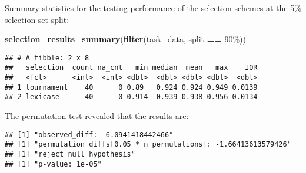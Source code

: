 \documentclass[
]{book}
\newenvironment{Shaded}{\begin{snugshade}}{\end{snugshade}}
\newcommand{\AttributeTok}[1]{\textcolor[rgb]{0.13,0.29,0.53}{#1}}
\newcommand{\DecValTok}[1]{\textcolor[rgb]{0.00,0.00,0.81}{#1}}
\newcommand{\FunctionTok}[1]{\textcolor[rgb]{0.13,0.29,0.53}{\textbf{#1}}}
\newcommand{\NormalTok}[1]{#1}
\newcommand{\OtherTok}[1]{\textcolor[rgb]{0.56,0.35,0.01}{#1}}
\newcommand{\SpecialCharTok}[1]{\textcolor[rgb]{0.81,0.36,0.00}{\textbf{#1}}}
\newcommand{\StringTok}[1]{\textcolor[rgb]{0.31,0.60,0.02}{#1}}
\begin{document}
Summary statistics for the testing performance of the selection schemes at the 5\% selection set split:

\begin{Shaded}
\begin{Highlighting}[]
\FunctionTok{selection\_results\_summary}\NormalTok{(}\FunctionTok{filter}\NormalTok{(task\_data, split }\SpecialCharTok{==} \StringTok{\textquotesingle{}90\%\textquotesingle{}}\NormalTok{))}
\end{Highlighting}
\end{Shaded}

\begin{verbatim}
## # A tibble: 2 x 8
##   selection  count na_cnt   min median  mean   max    IQR
##   <fct>      <int>  <int> <dbl>  <dbl> <dbl> <dbl>  <dbl>
## 1 tournament    40      0 0.89   0.924 0.924 0.949 0.0139
## 2 lexicase      40      0 0.914  0.939 0.938 0.956 0.0134
\end{verbatim}

The permutation test revealed that the results are:

\begin{Shaded}
\end{Shaded}

\begin{verbatim}
## [1] "observed_diff: -6.0941418442466"
## [1] "permutation_diffs[0.05 * n_permutations]: -1.66413613579426"
## [1] "reject null hypothesis"
## [1] "p-value: 1e-05"
\end{verbatim}
\end{document}
